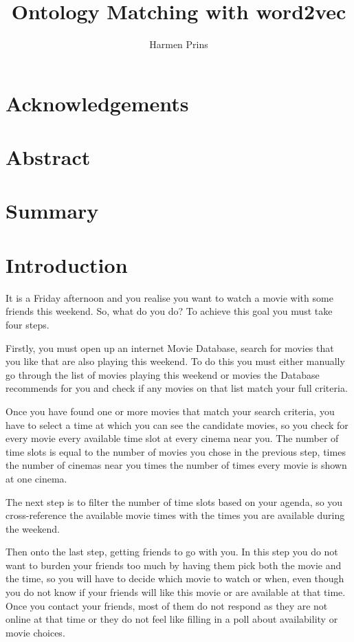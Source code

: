\documentclass{article}
\title{Ontology Matching with word2vec}
\author{Harmen Prins}
\begin{document}
 \maketitle
 \newpage
 
 \section*{Acknowledgements}
 \section*{Abstract}  
 
 \section*{Summary}
 \tableofcontents
 \newpage
 
 \section{Introduction}
 It is a Friday afternoon and you realise you want to watch a movie with some friends this weekend. So, what do you do? To achieve this goal you must take four steps.
 
 Firstly, you must open up an internet Movie Database, search for movies that you like that are also playing this weekend. To do this you must either manually go through the list of movies playing this weekend or movies the Database recommends for you and check if any movies on that list match your full criteria.
 
 Once you have found one or more movies that match your search criteria, you have to select a time at which you can see the candidate movies, so you check for every movie every available time slot at every cinema near you. The number of time slots is equal to the number of movies you chose in the previous step, times the number of cinemas near you times the number of times every movie is shown at one cinema.
 
 The next step is to filter the number of time slots based on your agenda, so you cross-reference the available movie times with the times you are available during the weekend.
 
 Then onto the last step, getting friends to go with you. In this step you do not want to burden your friends too much by having them pick both the movie and the time, so you will have to decide which movie to watch or when, even though you do not know if your friends will like this movie or are available at that time. Once you contact your friends, most of them do not respond as they are not online at that time or they do not feel like filling in a poll about availability or movie choices.
 
\end{document}
